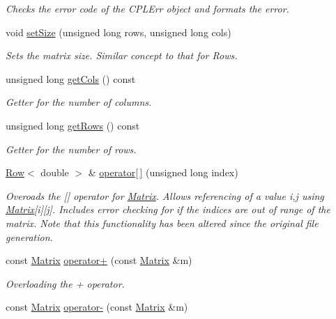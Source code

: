 \begin{DoxyCompactItemize}
\begin{DoxyCompactList}\small\item\em Checks the error code of the C\+P\+L\+Err object and formats the error. \end{DoxyCompactList}\item 
void \hyperlink{class_matrix_aa393296d4132d7aafc4e236ddfe59f06}{set\+Size} (unsigned long rows, unsigned long cols)
\begin{DoxyCompactList}\small\item\em Sets the matrix size. Similar concept to that for Rows. \end{DoxyCompactList}\item 
unsigned long \hyperlink{class_matrix_a9b4ce445c65dcea66c66dda875cc39d8}{get\+Cols} () const
\begin{DoxyCompactList}\small\item\em Getter for the number of columns. \end{DoxyCompactList}\item 
unsigned long \hyperlink{class_matrix_a442879db6473eeab202928dc47992206}{get\+Rows} () const
\begin{DoxyCompactList}\small\item\em Getter for the number of rows. \end{DoxyCompactList}\item 
\hyperlink{class_row}{Row}$<$ double $>$ \& \hyperlink{class_matrix_ae7e14b4bd8bb570260a4e578e4a601b7}{operator\mbox{[}$\,$\mbox{]}} (unsigned long index)
\begin{DoxyCompactList}\small\item\em Overoads the \mbox{[}\mbox{]} operator for \hyperlink{class_matrix}{Matrix}. Allows referencing of a value i,j using \hyperlink{class_matrix}{Matrix}\mbox{[}i\mbox{]}\mbox{[}j\mbox{]}. Includes error checking for if the indices are out of range of the matrix. Note that this functionality has been altered since the original file generation. \end{DoxyCompactList}\item 
const \hyperlink{class_matrix}{Matrix} \hyperlink{class_matrix_a311f3649e41cb4a3155f3f71a65829cb}{operator+} (const \hyperlink{class_matrix}{Matrix} \&m)
\begin{DoxyCompactList}\small\item\em Overloading the + operator. \end{DoxyCompactList}\item 
const \hyperlink{class_matrix}{Matrix} \hyperlink{class_matrix_a08e75978ea8288083ef36f53b4ac115d}{operator-\/} (const \hyperlink{class_matrix}{Matrix} \&m)

\end{DoxyCompactItemize}
